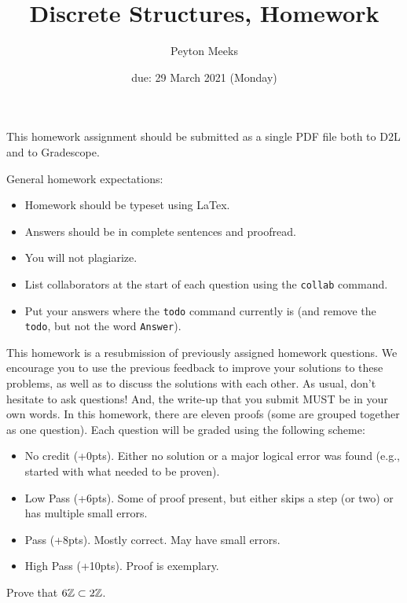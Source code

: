 \documentclass{article}
\title{Discrete Structures, Homework \hwnum}
\author{Peyton Meeks}
\date{due: 29 March 2021 (Monday)}
\begin{document}
\maketitle

This homework assignment should be
submitted as a single PDF file both to D2L and to Gradescope.

General homework expectations:
\begin{itemize}
    \item Homework should be typeset using LaTex.
    \item Answers should be in complete sentences and proofread.
    \item You will not plagiarize.
    \item List collaborators at the start of each question using the \texttt{collab} command.
    \item Put your answers where the \texttt{todo} command currently is (and
        remove the \texttt{todo}, but not the word \texttt{Answer}).
\end{itemize}

{\color{blue} This homework is a resubmission of previously assigned homework
questions.  We encourage you to use the previous feedback to improve your
solutions to these problems, as well as to discuss the solutions with each other.
As usual, don't hesitate to ask questions! And, the write-up that you submit
MUST be in your own words.  In
this homework, there are eleven proofs (some are grouped together as one
question).  Each question will be graded using the following scheme:
\begin{itemize}
    \item No credit (+0pts). Either no solution or a major logical error was found
        (e.g., started with what needed to be proven).
    \item Low Pass (+6pts). Some of proof present, but either skips a step (or
        two) or
        has multiple small errors.
    \item Pass (+8pts). Mostly correct. May have small errors.
    \item High Pass (+10pts). Proof is exemplary.
\end{itemize}
}



Prove that $6{\mathbb Z} \subset 2{\mathbb Z}$.
\end{document}
